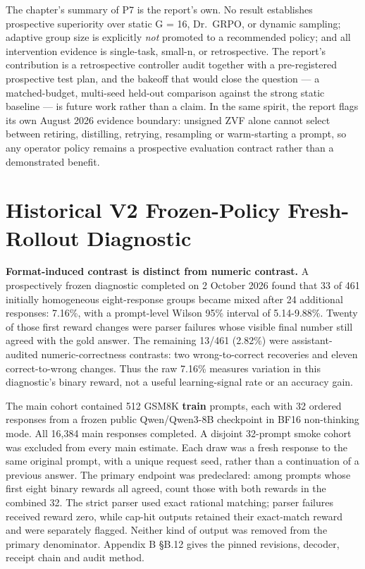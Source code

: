\documentclass[12pt,a4paper]{report}
\begin{document}
The chapter's summary of P7 is the report's own. No result establishes
prospective superiority over static G = 16, Dr.~GRPO, or dynamic
sampling; adaptive group size is explicitly \emph{not} promoted to a
recommended policy; and all intervention evidence is single-task,
small-n, or retrospective. The report's contribution is a retrospective
controller audit together with a pre-registered prospective test plan,
and the bakeoff that would close the question --- a matched-budget,
multi-seed held-out comparison against the strong static baseline --- is
future work rather than a claim. In the same spirit, the report flags
its own August 2026 evidence boundary: unsigned ZVF alone cannot select
between retiring, distilling, retrying, resampling or warm-starting a
prompt, so any operator policy remains a prospective evaluation contract
rather than a demonstrated benefit.

\section{Historical V2 Frozen-Policy Fresh-Rollout
Diagnostic}\label{historical-v2-frozen-policy-fresh-rollout-diagnostic}

\textbf{Format-induced contrast is distinct from numeric contrast.} A
prospectively frozen diagnostic completed on 2 October 2026 found that
33 of 461 initially homogeneous eight-response groups became mixed after
24 additional responses: 7.16\%, with a prompt-level Wilson 95\%
interval of 5.14-9.88\%. Twenty of those first reward changes were
parser failures whose visible final number still agreed with the gold
answer. The remaining 13/461 (2.82\%) were assistant-audited
numeric-correctness contrasts: two wrong-to-correct recoveries and
eleven correct-to-wrong changes. Thus the raw 7.16\% measures variation
in this diagnostic's binary reward, not a useful learning-signal rate or
an accuracy gain.

The main cohort contained 512 GSM8K \textbf{train} prompts, each with 32
ordered responses from a frozen public Qwen/Qwen3-8B checkpoint in BF16
non-thinking mode. All 16,384 main responses completed. A disjoint
32-prompt smoke cohort was excluded from every main estimate. Each draw
was a fresh response to the same original prompt, with a unique request
seed, rather than a continuation of a previous answer. The primary
endpoint was predeclared: among prompts whose first eight binary rewards
all agreed, count those with both rewards in the combined 32. The strict
parser used exact rational matching; parser failures received reward
zero, while cap-hit outputs retained their exact-match reward and were
separately flagged. Neither kind of output was removed from the primary
denominator. Appendix B §B.12 gives the pinned revisions, decoder,
receipt chain and audit method.
\end{document}

